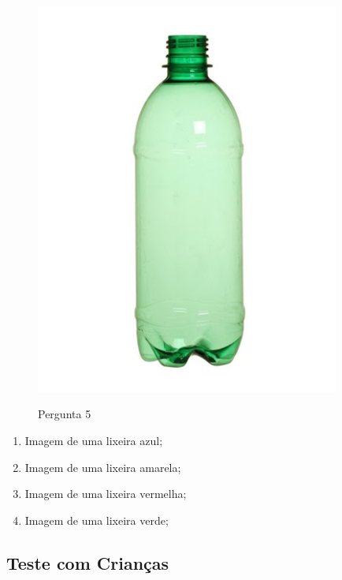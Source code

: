 \begin{enumerate}
    \begin{figure}[H]
        \caption{Pergunta 5}
        \centering
        \includegraphics[width=10cm]{Imagens/Cap5/Q5.png}
        \label{figura:q5}
    \end{figure}

     \begin{enumerate}
     \item Imagem de uma lixeira azul; 
     \item Imagem de uma lixeira amarela; 
     \item Imagem de uma lixeira vermelha; 
     \item Imagem de uma lixeira verde;
     \end{enumerate}


\end{enumerate}


\subsection{\textbf{Teste com Crianças}}

